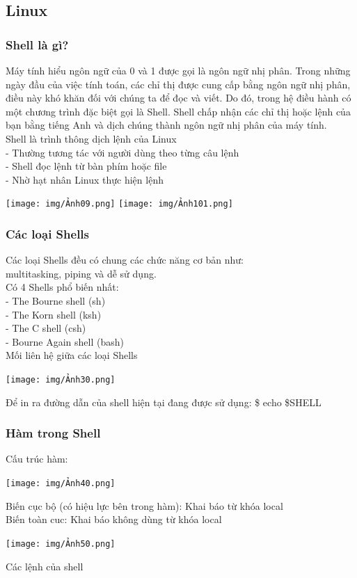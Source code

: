 \documentclass[12pt,a4paper]{article}
\begin{document}
\subsection{Linux}
\subsubsection{Shell là gì?}
Máy tính hiểu ngôn ngữ của 0 và 1 được gọi là ngôn ngữ nhị phân. Trong những ngày đầu của việc tính toán, các chỉ thị được cung cấp bằng ngôn ngữ nhị phân, điều này khó khăn đối với chúng ta để đọc và viết. Do đó, trong hệ điều hành có một chương trình đặc biệt gọi là Shell. Shell chấp nhận các chỉ thị hoặc lệnh của bạn bằng tiếng Anh và dịch chúng thành ngôn ngữ nhị phân của máy tính.\\

Shell là trình thông dịch lệnh của Linux\\
- Thường tương tác với người dùng theo từng câu lệnh\\
- Shell đọc lệnh từ bàn phím hoặc file\\
- Nhờ hạt nhân Linux thực hiện lệnh\\
\begin{center}
	\texttt{[image: img/Ảnh09.png]}
	\texttt{[image: img/Ảnh101.png]}
\end{center}
\subsubsection{Các loại Shells}
Các loại Shells đều có chung các chức năng cơ bản như:\\ multitasking, piping và dễ sử dụng.\\
Có 4 Shells phổ biến nhất:\\
- The Bourne shell (sh)\\
- The Korn shell (ksh)\\
- The C shell (csh)\\
- Bourne Again shell (bash)\\

Mối liên hệ giữa các loại Shells
\begin{center}
	\texttt{[image: img/Ảnh30.png]}
\end{center}
Để in ra đường dẫn của shell hiện tại đang được sử dụng:
\$ echo \$SHELL
\subsubsection{Hàm trong Shell}
Cấu trúc hàm:
\begin{center}
	\texttt{[image: img/Ảnh40.png]}
\end{center}
Biến cục bộ (có hiệu lực bên trong hàm): Khai báo từ khóa local\\
Biến toàn cuc: Khai báo không dùng từ khóa local
\begin{center}
	\texttt{[image: img/Ảnh50.png]}
\end{center}
Các lệnh của shell\\
\end{document}
